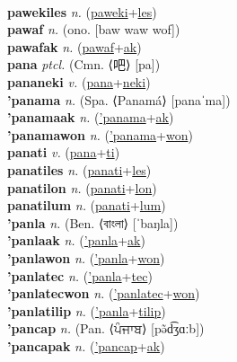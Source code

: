  \label{paweki} \\
\textbf{pawekiles} \textit{n.} (\hyperref[paweki]{paweki}+\hyperref[les]{les})
 \label{pawekiles} \\
\textbf{pawaf} \textit{n.} (ono. [baw waw wof])
 \label{pawaf} \\
\textbf{pawafak} \textit{n.} (\hyperref[pawaf]{pawaf}+\hyperref[ak]{ak})
 \label{pawafak} \\
\textbf{pana} \textit{ptcl.} (Cmn. ⟨吧⟩ [pa])
 \label{pana} \\
\textbf{pananeki} \textit{v.} (\hyperref[pana]{pana}+\hyperref[neki]{neki})
 \label{pananeki} \\
\textbf{'panama} \textit{n.} (Spa. ⟨Panamá⟩ [panaˈma])
 \label{'panama} \\
\textbf{'panamaak} \textit{n.} (\hyperref['panama]{'panama}+\hyperref[ak]{ak})
 \label{'panamaak} \\
\textbf{'panamawon} \textit{n.} (\hyperref['panama]{'panama}+\hyperref[won]{won})
 \label{'panamawon} \\
\textbf{panati} \textit{v.} (\hyperref[pana]{pana}+\hyperref[ti]{ti})
 \label{panati} \\
\textbf{panatiles} \textit{n.} (\hyperref[panati]{panati}+\hyperref[les]{les})
 \label{panatiles} \\
\textbf{panatilon} \textit{n.} (\hyperref[panati]{panati}+\hyperref[lon]{lon})
 \label{panatilon} \\
\textbf{panatilum} \textit{n.} (\hyperref[panati]{panati}+\hyperref[lum]{lum})
 \label{panatilum} \\
\textbf{'panla} \textit{n.} (Ben. ⟨বাংলা⟩ [ˈbaŋla])
 \label{'panla} \\
\textbf{'panlaak} \textit{n.} (\hyperref['panla]{'panla}+\hyperref[ak]{ak})
 \label{'panlaak} \\
\textbf{'panlawon} \textit{n.} (\hyperref['panla]{'panla}+\hyperref[won]{won})
 \label{'panlawon} \\
\textbf{'panlatec} \textit{n.} (\hyperref['panla]{'panla}+\hyperref[tec]{tec})
 \label{'panlatec} \\
\textbf{'panlatecwon} \textit{n.} (\hyperref['panlatec]{'panlatec}+\hyperref[won]{won})
 \label{'panlatecwon} \\
\textbf{'panlatilip} \textit{n.} (\hyperref['panla]{'panla}+\hyperref[tilip]{tilip})
 \label{'panlatilip} \\
\textbf{'pancap} \textit{n.} (Pan. ⟨ਪੰਜਾਬ⟩ [pə̃d͡ʒɑːb])
 \label{'pancap} \\
\textbf{'pancapak} \textit{n.} (\hyperref['pancap]{'pancap}+\hyperref[ak]{ak})
